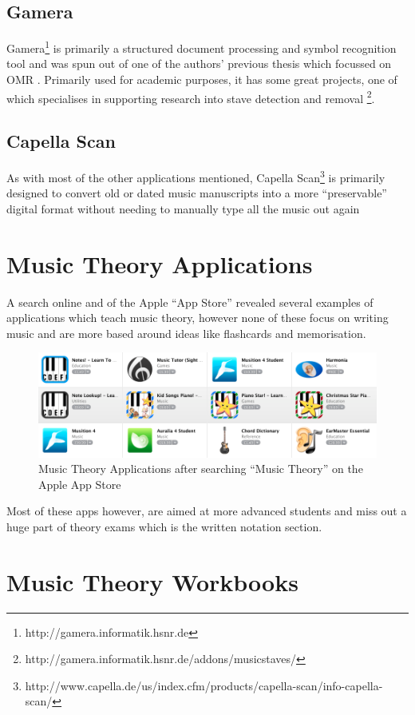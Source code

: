 \subsection{Gamera}
Gamera\footnote{http://gamera.informatik.hsnr.de} is primarily a structured document processing and symbol recognition tool \parencite{macmillan2002gamera} and was spun out of one of the authors' previous thesis which focussed on OMR \parencite{fujinaga1996adaptive}. Primarily used for academic purposes, it has some great projects, one of which specialises in supporting research into stave detection and removal \footnote{http://gamera.informatik.hsnr.de/addons/musicstaves/}.

\subsection{Capella Scan}
As with most of the other applications mentioned, Capella Scan\footnote{http://www.capella.de/us/index.cfm/products/capella-scan/info-capella-scan/} is primarily designed to convert old or dated music manuscripts into a more ``preservable'' digital format without needing to manually type all the music out again

\section{Music Theory Applications}
A search online and of the Apple ``App Store'' revealed several examples of applications which teach music theory, however none of these focus on writing music and are more based around ideas like flashcards and memorisation.

\begin{figure}[h!]
  \centering
  \includegraphics[width=\linewidth]{gfx/music-theory-apps.png}
  \caption{Music Theory Applications after searching ``Music Theory'' on the Apple App Store}
\end{figure}

Most of these apps however, are aimed at more advanced students and miss out a huge part of theory exams which is the written notation section.

\section{Music Theory Workbooks}
